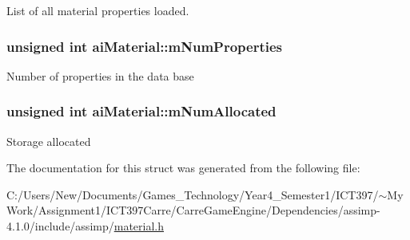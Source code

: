 List of all material properties loaded. \hypertarget{structai_material_243b07afdc6507f8878c93a2cafe4963}{
\subsubsection[mNumProperties]{\setlength{\rightskip}{0pt plus 5cm}unsigned int {\bf aiMaterial::mNumProperties}}}
\label{structai_material_243b07afdc6507f8878c93a2cafe4963}


Number of properties in the data base \hypertarget{structai_material_84a0016a263362c52b27a9d8d76dc449}{
\subsubsection[mNumAllocated]{\setlength{\rightskip}{0pt plus 5cm}unsigned int {\bf aiMaterial::mNumAllocated}}}
\label{structai_material_84a0016a263362c52b27a9d8d76dc449}


Storage allocated 

The documentation for this struct was generated from the following file:\begin{CompactItemize}
\item 
C:/Users/New/Documents/Games\_\-Technology/Year4\_\-Semester1/ICT397/$\sim$My Work/Assignment1/ICT397Carre/CarreGameEngine/Dependencies/assimp-4.1.0/include/assimp/\hyperlink{material_8h}{material.h}\end{CompactItemize}
